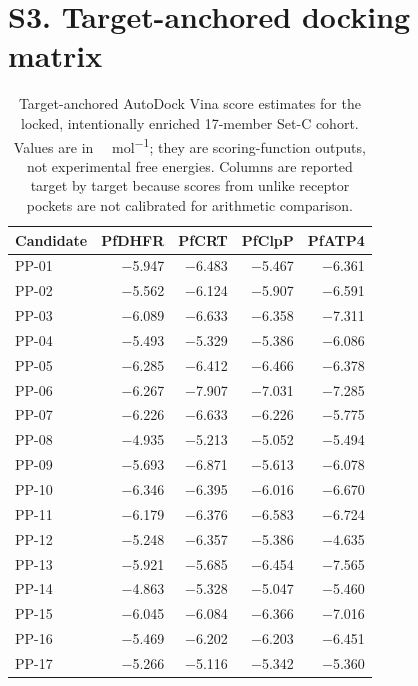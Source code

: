 \documentclass[journal=jcisd8,manuscript=suppinfo]{achemso}
\begin{document}
\section*{S3. Target-anchored docking matrix}
\begin{table}[h]
\centering
\caption{Target-anchored AutoDock Vina score estimates for the locked, intentionally enriched 17-member Set-C cohort. Values are in \si{\kilo\calorie\per\mole}; they are scoring-function outputs, not experimental free energies. Columns are reported target by target because scores from unlike receptor pockets are not calibrated for arithmetic comparison.}
\label{tab:vina}
\small
\begin{tabular}{@{}lrrrr@{}}
\toprule
Candidate & PfDHFR & PfCRT & PfClpP & PfATP4 \\
\midrule
PP-01 & \num{-5.947} & \num{-6.483} & \num{-5.467} & \num{-6.361} \\
PP-02 & \num{-5.562} & \num{-6.124} & \num{-5.907} & \num{-6.591} \\
PP-03 & \num{-6.089} & \num{-6.633} & \num{-6.358} & \num{-7.311} \\
PP-04 & \num{-5.493} & \num{-5.329} & \num{-5.386} & \num{-6.086} \\
PP-05 & \num{-6.285} & \num{-6.412} & \num{-6.466} & \num{-6.378} \\
PP-06 & \num{-6.267} & \num{-7.907} & \num{-7.031} & \num{-7.285} \\
PP-07 & \num{-6.226} & \num{-6.633} & \num{-6.226} & \num{-5.775} \\
PP-08 & \num{-4.935} & \num{-5.213} & \num{-5.052} & \num{-5.494} \\
PP-09 & \num{-5.693} & \num{-6.871} & \num{-5.613} & \num{-6.078} \\
PP-10 & \num{-6.346} & \num{-6.395} & \num{-6.016} & \num{-6.670} \\
PP-11 & \num{-6.179} & \num{-6.376} & \num{-6.583} & \num{-6.724} \\
PP-12 & \num{-5.248} & \num{-6.357} & \num{-5.386} & \num{-4.635} \\
PP-13 & \num{-5.921} & \num{-5.685} & \num{-6.454} & \num{-7.565} \\
PP-14 & \num{-4.863} & \num{-5.328} & \num{-5.047} & \num{-5.460} \\
PP-15 & \num{-6.045} & \num{-6.084} & \num{-6.366} & \num{-7.016} \\
PP-16 & \num{-5.469} & \num{-6.202} & \num{-6.203} & \num{-6.451} \\
PP-17 & \num{-5.266} & \num{-5.116} & \num{-5.342} & \num{-5.360} \\
\bottomrule
\end{tabular}
\end{table}
\end{document}
